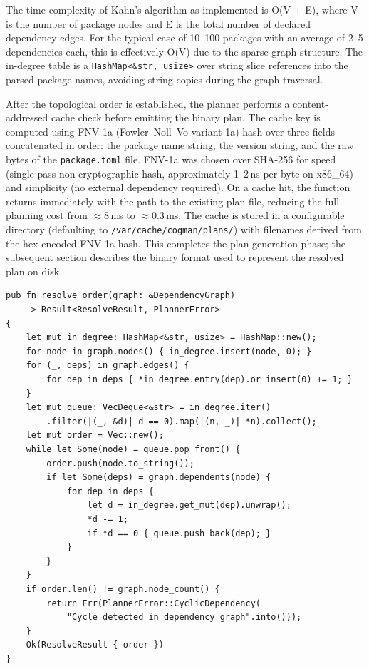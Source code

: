 \documentclass[12pt,a4paper]{report}
\begin{document}
The time complexity of Kahn's algorithm as implemented is O(V + E), where V is
the number of package nodes and E is the total number of declared dependency
edges. For the typical case of 10--100 packages with an average of 2--5
dependencies each, this is effectively O(V) due to the sparse graph structure.
The in-degree table is a \texttt{HashMap<\&str, usize>} over string slice
references into the parsed package names, avoiding string copies during the
graph traversal.

After the topological order is established, the planner performs a
content-addressed cache check before emitting the binary plan. The cache key is
computed using FNV-1a (Fowler--Noll--Vo variant 1a) hash over three fields
concatenated in order: the package name string, the version string, and the raw
bytes of the \texttt{package.toml} file. FNV-1a was chosen over SHA-256 for
speed (single-pass non-cryptographic hash, approximately 1--2\,ns per byte on
x86\_64) and simplicity (no external dependency required). On a cache hit, the
function returns immediately with the path to the existing plan file, reducing
the full planning cost from $\approx$8\,ms to $\approx$0.3\,ms. The cache is
stored in a configurable directory (defaulting to \texttt{/var/cache/cogman/plans/})
with filenames derived from the hex-encoded FNV-1a hash. This completes the
plan generation phase; the subsequent section describes the binary format used to
represent the resolved plan on disk.

\begin{lstlisting}[language={}, caption={Topological Sort --- cogman/src/graph/topo.rs}]
pub fn resolve_order(graph: &DependencyGraph)
    -> Result<ResolveResult, PlannerError>
{
    let mut in_degree: HashMap<&str, usize> = HashMap::new();
    for node in graph.nodes() { in_degree.insert(node, 0); }
    for (_, deps) in graph.edges() {
        for dep in deps { *in_degree.entry(dep).or_insert(0) += 1; }
    }
    let mut queue: VecDeque<&str> = in_degree.iter()
        .filter(|(_, &d)| d == 0).map(|(n, _)| *n).collect();
    let mut order = Vec::new();
    while let Some(node) = queue.pop_front() {
        order.push(node.to_string());
        if let Some(deps) = graph.dependents(node) {
            for dep in deps {
                let d = in_degree.get_mut(dep).unwrap();
                *d -= 1;
                if *d == 0 { queue.push_back(dep); }
            }
        }
    }
    if order.len() != graph.node_count() {
        return Err(PlannerError::CyclicDependency(
            "Cycle detected in dependency graph".into()));
    }
    Ok(ResolveResult { order })
}
\end{lstlisting}
\end{document}
